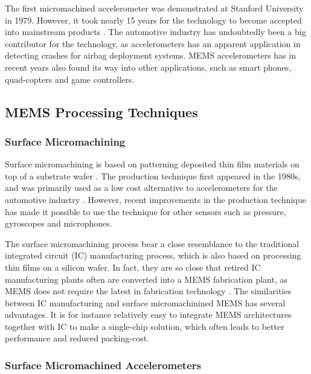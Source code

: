 The first micromachined accelerometer was demonstrated at Stanford University in 1979. However, it took nearly 15 years for the technology to become accepted into mainstream products \cite[p.~8]{maluf04}. The automotive industry has undoubtedly been a big contributor for the technology, as accelerometers has an apparent application in detecting crashes for airbag deployment systems. MEMS accelerometers has in recent years also found its way into other applications, such as smart phones, quad-copters and game controllers. 

\subsection{MEMS Processing Techniques}

\subsubsection{Surface Micromachining}

Surface micromachining is based on patterning deposited thin film materials on top of a substrate wafer \cite[p.~5]{kaajakari09}. The production technique first appeared in the 1980s, and was primarily used as a low cost alternative to accelerometers for the automotive industry \cite[p.~101]{maluf04}. However, recent improvements in the production technique has made it possible to use the technique for other sensors such as pressure, gyroscopes and microphones. 

The surface micromachining process bear a close resemblance to the traditional integrated circuit (IC) manufacturing process, which is also based on processing thin films on a silicon wafer. In fact, they are so close that retired IC manufacturing plants often are converted into a MEMS fabrication plant, as MEMS does not require the latest in fabrication technology \cite[p.~4]{kaajakari09}. The similarities between IC manufacturing and surface micromachinined MEMS has several advantages. It is for instance relatively easy to integrate MEMS architectures together with IC to make a single-chip solution, which often leads to better performance and reduced packing-cost. 

\subsubsection{Surface Micromachined Accelerometers}


